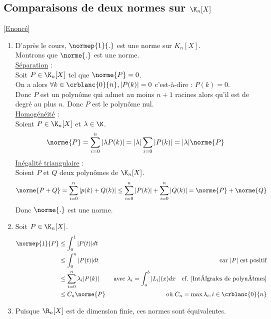 \documentclass{book}
\begin{document}
	\subsection{Comparaisons de deux normes sur $\K_n[X]$}\label{sec:comparaison-de-deux-normes-sur-knx}
	\textcolor{blue}{\hyperref[Comparaison de deux normes sur KnX]{[Enoncé]}}\\
	\begin{enumerate}[leftmargin=*]
		\item D'après le cours, $\normep{1}{.}$ est une norme sur $K_n[X]$.\\
		Montrons que $\norme{.}$ est une norme.\\
		\textbullet\underline{Séparation} :\\ Soit $P\in\K_n[X]$ tel que $\norme{P}=0$.\\
		 On a alors $\forall k\in\crblanc{0}{n}, |P(k)|=0$ c'est-à-dire : $P(k)=0$.\\
		 Donc $P$ est un polynôme qui admet au moins $n+1$ racines alors qu'il est de degré au plus $n$. Donc $P$ est le polynôme nul.\\
		 \textbullet\underline{Homogénéité} :\\ Soient $P\in\K_n[X]$ et $\lambda\in\K$.\\
		 \[\norme{P}=\sum_{i=0}^{n}|\lambda P(k)|=|\lambda|\sum_{i=0}|P(k)|=|\lambda|\norme{P}\]
		\textbullet\underline{Inégalité triangulaire} :\\ Soient $P$ et $Q$ deux polynômes de $\K_n[X]$.
		\[\norme{P+Q}=\sum_{i=0}^{n}|p(k)+Q(k)|\leq \sum_{i=0}^{n}|P(k)|+\sum_{i=0}^{n}|Q(k)|=\norme{P}+\norme{Q}\]
		Donc $\norme{.}$ est une norme.
		\item Soit $P\in\K_n[X]$.\\
		\begin{align*}
			\normep{1}{P}&\leq \int_{0}^{1}|P(t)|dt\\
			&\leq\int_{0}^{n}|P(t)|dt &\text{car $|P|$ est positif}\\
			&\leq \sum_{i=0}^n\lambda_i|P(k)| &\text{ avec }\lambda_i=\displaystyle\int_a^b|L_i|(x)dx \quad\text{cf. \ref{Intégrales de polynômes}}\\
			&\leq C_n\norme{P} & \text{ où } C_n=\max{\lambda_i, i\in\crblanc{0}{n}}
		\end{align*}
		\item Puisque $\R_n[X]$ est de dimension finie, ces normes sont équivalentes.
		 
	\end{enumerate}
	
\end{document}
